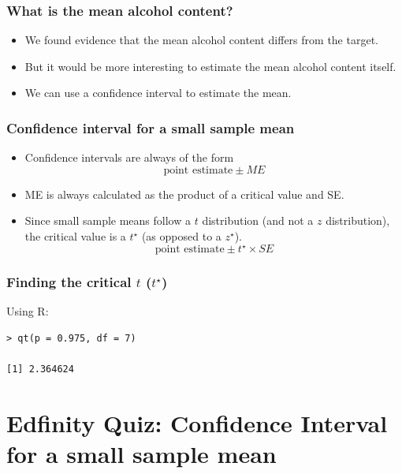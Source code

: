 \documentclass[slidestop,compress,mathserif]{beamer}
\begin{document}


\begin{frame}
\frametitle{What is the mean alcohol content?}

\begin{itemize}
\item We found evidence that the mean alcohol content differs from the target.
\pause
\item But it would be more interesting to estimate the mean alcohol content itself.
\pause
\item We can use a confidence interval to estimate the mean.
\end{itemize}
\end{frame}



\begin{frame}
\frametitle{Confidence interval for a small sample mean}

\begin{itemize}
\item Confidence intervals are always of the form
\[ \text{point estimate} \pm {ME} \]
\pause
\item ME is always calculated as the product of a critical value and SE.
\pause
\item Since small sample means follow a $t$ distribution (and not a $z$ distribution), the critical value is a $t^\star$ (as opposed to a $z^\star$).
\[ \text{point estimate} \pm t^{\star} \times SE \]
\end{itemize}
\end{frame}



\begin{frame}[fragile]
\frametitle{Finding the critical $t$ ($t^\star$)}

Using R:
\begin{verbatim}
> qt(p = 0.975, df = 7)

[1] 2.364624
\end{verbatim}
\end{frame}


\section{Edfinity Quiz: Confidence Interval for a small sample mean}

\end{document}
